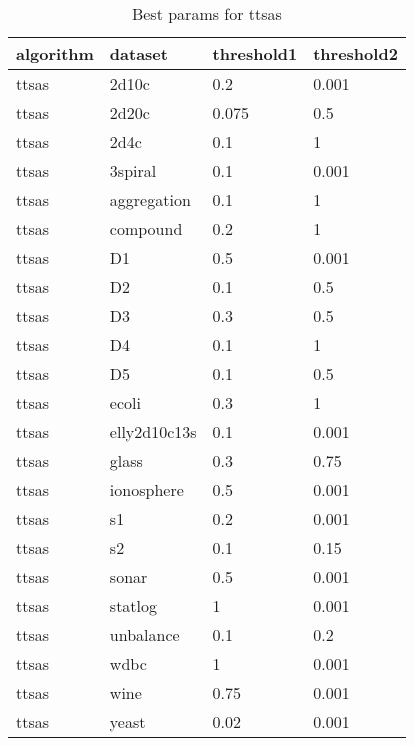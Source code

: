 \begin{table}[H]
\centering
\caption{Best params for ttsas}
\label{tab:params:ttsas}
\begin{tabular}{|l|l|l|l|}
\hline
algorithm & dataset & threshold1 & threshold2 \\
\hline
ttsas & 2d10c & 0.2 & 0.001 \\
\hline
ttsas & 2d20c & 0.075 & 0.5 \\
\hline
ttsas & 2d4c & 0.1 & 1 \\
\hline
ttsas & 3spiral & 0.1 & 0.001 \\
\hline
ttsas & aggregation & 0.1 & 1 \\
\hline
ttsas & compound & 0.2 & 1 \\
\hline
ttsas & D1 & 0.5 & 0.001 \\
\hline
ttsas & D2 & 0.1 & 0.5 \\
\hline
ttsas & D3 & 0.3 & 0.5 \\
\hline
ttsas & D4 & 0.1 & 1 \\
\hline
ttsas & D5 & 0.1 & 0.5 \\
\hline
ttsas & ecoli & 0.3 & 1 \\
\hline
ttsas & elly2d10c13s & 0.1 & 0.001 \\
\hline
ttsas & glass & 0.3 & 0.75 \\
\hline
ttsas & ionosphere & 0.5 & 0.001 \\
\hline
ttsas & s1 & 0.2 & 0.001 \\
\hline
ttsas & s2 & 0.1 & 0.15 \\
\hline
ttsas & sonar & 0.5 & 0.001 \\
\hline
ttsas & statlog & 1 & 0.001 \\
\hline
ttsas & unbalance & 0.1 & 0.2 \\
\hline
ttsas & wdbc & 1 & 0.001 \\
\hline
ttsas & wine & 0.75 & 0.001 \\
\hline
ttsas & yeast & 0.02 & 0.001 \\
\hline
\end{tabular}
\end{table}